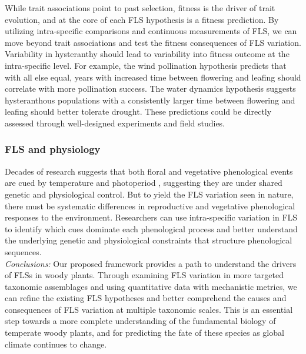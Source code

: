 \documentclass{article}
\begin{document}
While trait associations point to past selection, fitness is the driver of trait evolution, and at the core of each FLS hypothesis is a fitness prediction. By utilizing intra-specific comparisons and continuous measurements of FLS, we can move beyond trait associations and test the fitness consequences of FLS variation. \\
\indent Variability in hysteranthy should lead to variability into fitness outcome at the intra-specific level. For example, the wind pollination hypothesis predicts that with all else equal, years with increased time between flowering and leafing should correlate with more pollination success. The water dynamics hypothesis suggests hysteranthous populations with a consistently larger time between flowering and leafing should better tolerate drought. These predictions could be directly assessed through well-designed experiments and field studies.\\

\subsubsection*{FLS and physiology} 
Decades of research suggests that both floral and vegetative phenological events are cued by temperature and photoperiod \citep{Forrest2010, Flynn2018}, suggesting they are under shared genetic and physiological control. But to yield the FLS variation seen in nature, there must be systematic differences in reproductive and vegetative phenological responses to the environment. Researchers can use intra-specific variation in FLS to identify which cues dominate each phenological process and better understand the underlying genetic and physiological constraints that structure phenological sequences.\\

\emph{Conclusions:} Our proposed framework provides a path to understand the drivers of FLSs in woody plants. Through examining FLS variation in more targeted taxonomic assemblages and using quantitative data with mechanistic metrics, we can refine the existing FLS hypotheses and better comprehend the causes and consequences of FLS variation at multiple taxonomic scales. This is an essential step towards a more complete understanding of the fundamental biology of temperate woody plants, and for predicting the fate of these species as global climate continues to change.
\end{document}
